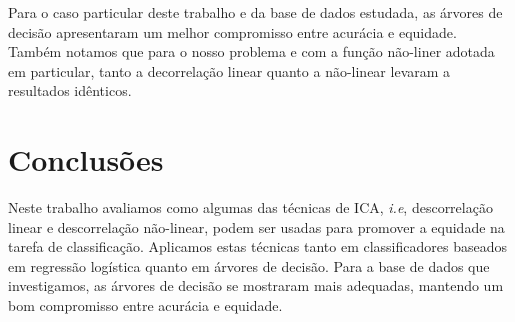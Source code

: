 \documentclass[11pt]{article}
\begin{document}
Para o caso particular deste trabalho e da base de dados estudada, as
árvores de decisão apresentaram um melhor compromisso entre acurácia e
equidade. Também notamos que para o nosso problema e com a função
não-liner adotada em particular, tanto a decorrelação linear quanto a
não-linear levaram a resultados idênticos.

    \section{Conclusões}\label{conclusuxf5es}

Neste trabalho avaliamos como algumas das técnicas de ICA, \emph{i.e},
descorrelação linear e descorrelação não-linear, podem ser usadas para
promover a equidade na tarefa de classificação. Aplicamos estas técnicas
tanto em classificadores baseados em regressão logística quanto em
árvores de decisão. Para a base de dados que investigamos, as árvores de
decisão se mostraram mais adequadas, mantendo um bom compromisso entre
acurácia e equidade.


    
    



    
    
\end{document}
